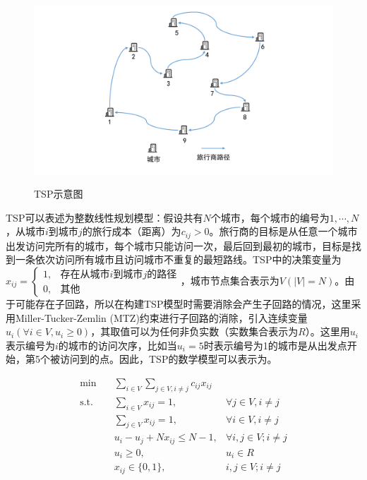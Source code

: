 \documentclass[fontset=none]{ctexart}
\begin{document}
\begin{figure}[!htb]
    \centering
    \includegraphics[width=\linewidth]{images/TSP.pdf}\\
    \caption{TSP示意图}
\end{figure}

TSP可以表述为整数线性规划模型\cite{papadimitriou1998combinatorial}：假设共有$N$个城市，每个城市的编号为$1,\cdots,N$，从城市$i$到城市$j$的旅行成本（距离）为$c_{ij}>0$。旅行商的目标是从任意一个城市出发访问完所有的城市，每个城市只能访问一次，最后回到最初的城市，目标是找到一条依次访问所有城市且访问城市不重复的最短路线。TSP中的决策变量为$x_{ij}=\begin{cases}1, & \text{存在从城市$i$到城市$j$的路径}\\0, & \text{其他} \end{cases}$，城市节点集合表示为$V(|V| = N)$。由于可能存在子回路，所以在构建TSP模型时需要消除会产生子回路的情况，这里采用Miller-Tucker-Zemlin (MTZ)约束进行子回路的消除\cite{1960Integer}，引入连续变量$u_i(\forall i \in V, u_i \geq 0)$，其取值可以为任何非负实数（实数集合表示为$R$）。这里用$u_i$表示编号为$i$的城市的访问次序，比如当$u_i = 5$时表示编号为1的城市是从出发点开始，第5个被访问到的点。因此，TSP的数学模型可以表示为。

\begin{align}
    \min \quad & \sum_{i \in V}\sum_{j \in V, i \neq j} c_{ij}x_{ij} & \label{eq:tsp-obj}\\
    \text{s.t.} \quad & \sum_{i \in V} x_{ij} = 1, & \forall j \in V, i \neq j\label{eq:tsp-in}\\
    \quad & \sum_{j \in V} x_{ij} = 1, & \forall i \in V, i \neq j \label{eq:tsp-out}\\
    \quad & u_i - u_j + Nx_{ij} \leq N - 1, & \forall i, j \in V; i \neq j \label{eq:tsp-subtour}\\
    \quad & u_i \geq 0, & u_i \in R \label{eq:tsp-u_bound}\\
    \quad & x_{ij} \in \{0, 1\}, & i, j \in V; i \neq j \label{eq:tsp-x_bound}
\end{align}
\end{document}
